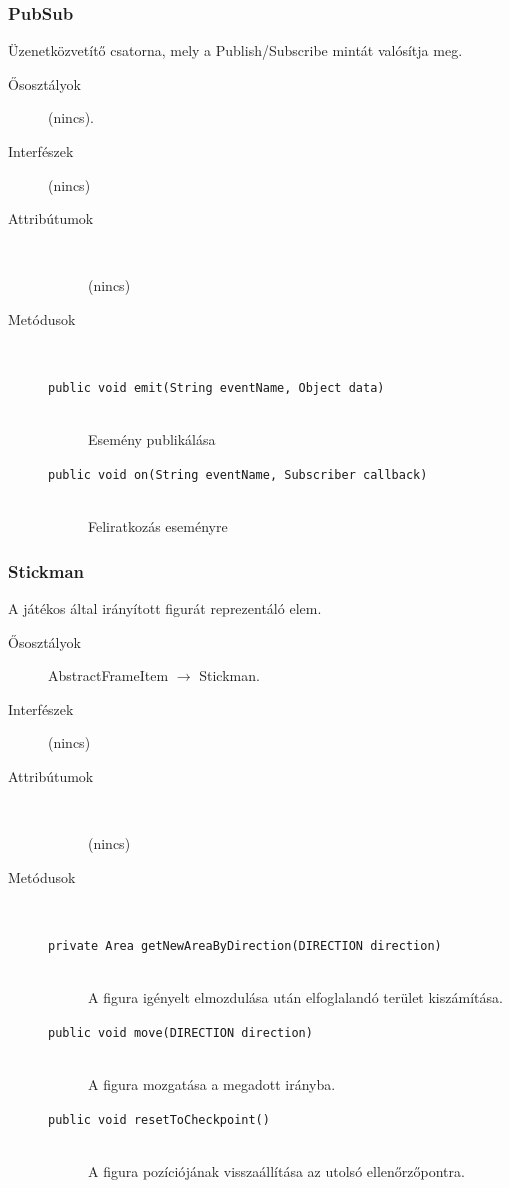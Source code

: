 		\subsubsection{PubSub}
				 Üzenetközvetítő csatorna, mely a Publish/Subscribe mintát valósítja meg. 			\begin{description}


				\item[Ősosztályok] (nincs).
				\item[Interfészek] (nincs)
				\item[Attribútumok]$\ $
					\begin{description}
						\item[] (nincs)
					\end{description}
				\item[Metódusok]$\ $
					\begin{description}
						\item[\texttt{public void emit(String eventName, Object data)}] \hfill \\ Esemény publikálása 
						\item[\texttt{public void on(String eventName, Subscriber callback)}] \hfill \\ Feliratkozás eseményre 
					\end{description}
			\end{description}

		\subsubsection{Stickman}
				 A játékos által irányított figurát reprezentáló elem. 			\begin{description}


				\item[Ősosztályok] AbstractFrameItem $\rightarrow{}$ Stickman.
				\item[Interfészek] (nincs)
				\item[Attribútumok]$\ $
					\begin{description}
						\item[] (nincs)
					\end{description}
				\item[Metódusok]$\ $
					\begin{description}
						\item[\texttt{private Area getNewAreaByDirection(DIRECTION direction)}] \hfill \\ A figura igényelt elmozdulása után elfoglalandó  terület kiszámítása. 
						\item[\texttt{public void move(DIRECTION direction)}] \hfill \\ A figura mozgatása a megadott irányba. 
						\item[\texttt{public void resetToCheckpoint()}] \hfill \\ A figura pozíciójának visszaállítása az  utolsó ellenőrzőpontra. 
					\end{description}
			\end{description}

